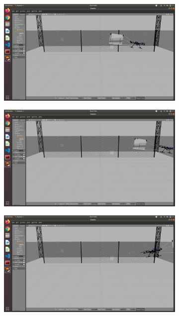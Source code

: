 \documentclass[../Head/Main.tex]{subfiles}
\begin{document}
\begin{figure}[h]
\begin{subfigure}{\figSize}
        \end{subfigure}
        \begin{subfigure}{\figSize}
            \centering
            \includegraphics[width=\textwidth]{../Figures/simulation/Simulation_06.png}
        \end{subfigure}
        \begin{subfigure}{\figSize}
            \centering
            \includegraphics[width=\textwidth]{../Figures/simulation/Simulation_07.png}
        \end{subfigure}
        \begin{subfigure}{\figSize}
            \centering
            \includegraphics[width=\textwidth]{../Figures/simulation/Simulation_08.png}

\end{subfigure}
\end{figure}
\end{document}
